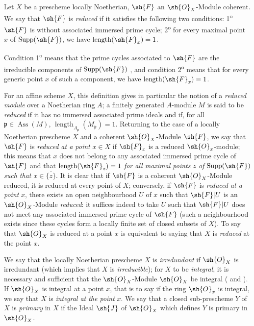 \begin{definition}[3.2.2]
\label{IV.3.2.2}
Let $X$ be a prescheme locally Noetherian, $\sh{F}$ an $\sh{O}_X$-Module coherent.
We say that $\sh{F}$ is \emph{reduced} if it satisfies the following two conditions: 1\textsuperscript{o} $\sh{F}$ is without associated immersed prime cycle; 2\textsuperscript{o} for every maximal point $x$ of $\operatorname{Supp}(\sh{F})$, we have $\operatorname{length}(\sh{F}_x)=1$.
\end{definition}

Condition 1\textsuperscript{o} means that the prime cycles associated to $\sh{F}$ are the irreducible components of $\operatorname{Supp}(\sh{F})$ , and condition 2\textsuperscript{o} means that for every generic point $x$ of such a component, we have $\operatorname{length}(\sh{F}_x)=1$.

For an affine scheme $X$, this definition gives in particular the notion of a \emph{reduced module} over a Noetherian ring $A$; a finitely generated $A$-module $M$ is said to be \emph{reduced} if it has no immersed associated prime ideals and if, for all $\mathfrak{p}\in\operatorname{Ass}(M)$, $\operatorname{length}_{A_\mathfrak{p}}(M_\mathfrak{p})=1$.
Returning to the case of a locally Noetherian prescheme $X$ and a coherent $\sh{O}_X$-Module $\sh{F}$, we say that $\sh{F}$ is \emph{reduced at a point} $x\in X$ if $\sh{F}_x$ is a reduced $\sh{O}_x$-module; this means that $x$ does not belong to any associated immersed prime cycle of $\sh{F}$ and that $\operatorname{length}(\sh{F}_z)=1$ \emph{for all maximal points $z$ of $\operatorname{Supp}(\sh{F})$ such that $x\in\overline{\{z\}}$}.
It is clear that if $\sh{F}$ is a coherent $\sh{O}_X$-Module reduced, it is reduced at every point of $X$; conversely, if $\sh{F}$ is \emph{reduced at a point} $x$, there exists an open neighbourhood $U$ of $x$ such that $\sh{F}|U$ is an $\sh{O}_X$-Module \emph{reduced}: it suffices indeed to take $U$ such that $\sh{F}|U$ does not meet any associated immersed prime cycle of $\sh{F}$ (such a neighbourhood exists since these cycles form a locally finite set of closed subsets of $X$).
To say that $\sh{O}_X$ is reduced at a point $x$ is equivalent to saying that $X$ is \emph{reduced} at the point $x$.


We say that the locally Noetherian prescheme $X$ is \emph{irredundant} if $\sh{O}_X$ is irredundant (which implies that $X$ is \emph{irreducible}); for $X$ to be \emph{integral}, it is necessary and sufficient that the $\sh{O}_X$-Module $\sh{O}_X$ be integral ( and ).
If $\sh{O}_X$ is integral at a point $x$, that is to say if the ring $\sh{O}_x$ is integral, we say that $X$ is \emph{integral at the point} $x$.
We say that a closed sub-prescheme $Y$ of $X$ is \emph{primary} in $X$ if the Ideal $\sh{J}$ of $\sh{O}_X$ which defines $Y$ is primary in $\sh{O}_X$.

